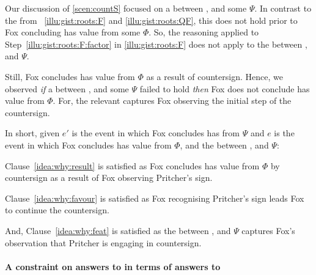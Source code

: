 \begin{note}
  Our discussion of \autoref{scen:countS} focused on a \ros{} between ,  and some \pool{} \(\Psi\).
  In contrast to the  from ~\ref{illu:gist:roots:F} and \ref{illu:gist:roots:QF}, this \ros{} does not hold prior to Fox concluding  has value  from some \pool{} \(\Phi\).
  So, the reasoning applied to Step~\ref{illu:gist:roots:F:factor} in \autoref{illu:gist:roots:F} does not apply to the between ,  and \(\Psi\).

  Still, Fox concludes \propI{\signConA{}} has value  from \(\Phi\) as a result of countersign.
  Hence, we observed \emph{if} a \ros{} between ,  and some \pool{} \(\Psi\) failed to hold \emph{then} Fox does not conclude \propI{\signConA{}} has value  from \(\Phi\).
  For, the relevant \ros{} captures Fox observing the initial step of the countersign.

  In short, given \(e'\) is the event in which Fox concludes  has   from \(\Psi\) and \(e\) is the event in which Fox concludes \propI{\signConA{}} has value  from \(\Phi\), and the \ros{} between ,  and \(\Psi\):

  Clause~\ref{idea:why:result} is satisfied as Fox concludes \propI{\signConA{}} has value  from \(\Phi\) by countersign as a result of Fox observing Pritcher's sign.

  Clause~\ref{idea:why:favour} is satisfied as Fox recognising Pritcher's sign leads Fox to continue the countersign.

  And, Clause~\ref{idea:why:feat} is satisfied as the \ros{} between ,  and \(\Psi\) captures Fox's observation that Pritcher is engaging in countersign.

\end{note}




\paragraph*{A constraint on answers to \qWhy{} in terms of answers to \qHow{}}


